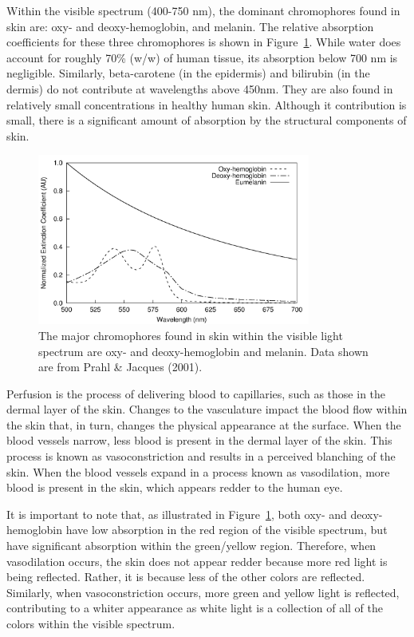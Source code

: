 Within the visible spectrum (400-750 nm), the dominant chromophores found in skin are: oxy- and deoxy-hemoglobin, and melanin. The relative absorption coefficients for these three chromophores is shown in Figure~\ref{fig:intro-skin_chromophores}. While water does account for roughly 70\% (w/w) of human tissue,\cite{Nakagawa2010} its absorption below 700 nm is negligible. Similarly, beta-carotene (in the epidermis) and bilirubin (in the dermis) do not contribute at wavelengths above 450nm. They are also found in relatively small concentrations in healthy human skin. Although it contribution is small, there is a significant amount of absorption by the structural components of skin.\cite{Bargo2005}

\begin{figure}
	\centering \includegraphics[width=0.8\textwidth]{figures/intro-skin_chromophores.png}
	\caption[The major chromophores of skin within the visible light spectrum]{\label{fig:intro-skin_chromophores}The major chromophores found in skin within the visible light spectrum are oxy- and deoxy-hemoglobin and melanin. Data shown are from Prahl \& Jacques (2001).\cite{Prahl2001}}
\end{figure}

Perfusion is the process of delivering blood to capillaries, such as those in the dermal layer of the skin. Changes to the vasculature impact the blood flow within the skin that, in turn, changes the physical appearance at the surface. When the blood vessels narrow, less blood is present in the dermal layer of the skin. This process is known as vasoconstriction and results in a perceived blanching of the skin. When the blood vessels expand in a process known as vasodilation, more blood is present in the skin, which appears redder to the human eye.

It is important to note that, as illustrated in Figure~\ref{fig:intro-skin_chromophores}, both oxy- and deoxy-hemoglobin have low absorption in the red region of the visible spectrum, but have significant absorption within the green/yellow region. Therefore, when vasodilation occurs, the skin does not appear redder because more red light is being reflected. Rather, it is because less of the other colors are reflected. Similarly, when vasoconstriction occurs, more green and yellow light is reflected, contributing to a whiter appearance as white light is a collection of all of the colors within the visible spectrum.

